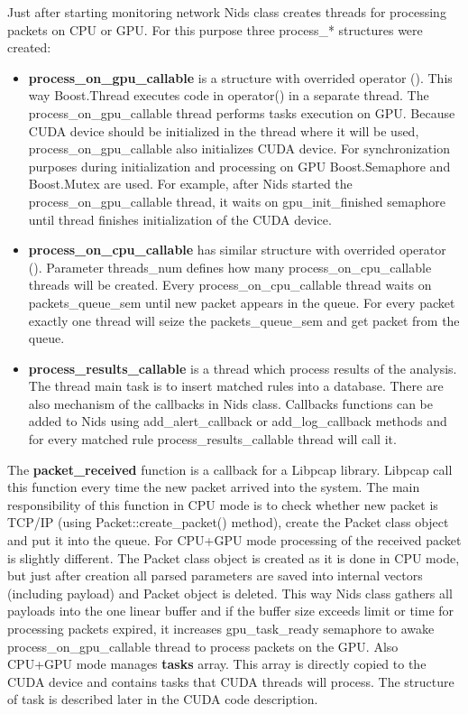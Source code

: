 \documentclass[thesis=M,english]{FITthesis}[2011/07/15]
\begin{document}
Just after starting monitoring network Nids class creates threads for processing packets on CPU or GPU. For this purpose three process\_* structures were created:
\begin{itemize}
\item \textbf{process\_on\_gpu\_callable} is a structure with overrided operator (). This way Boost.Thread executes code in operator() in a separate thread. The process\_on\_gpu\_callable thread performs tasks execution on GPU. Because CUDA device should be initialized in the thread where it will be used, process\_on\_gpu\_callable also initializes CUDA device. For synchronization purposes during initialization and processing on GPU Boost.Semaphore and Boost.Mutex are used. For example, after Nids started the process\_on\_gpu\_callable thread, it waits on gpu\_init\_finished semaphore until thread finishes initialization of the CUDA device.
\item \textbf{process\_on\_cpu\_callable} has similar structure with overrided operator (). Parameter threads\_num defines how many process\_on\_cpu\_callable threads will be created. Every process\_on\_cpu\_callable thread waits on packets\_queue\_sem until new packet appears in the queue. For every packet exactly one thread will seize the packets\_queue\_sem and get packet from the queue.
\item \textbf{process\_results\_callable} is a thread which process results of the analysis. The thread main task is to insert matched rules into a database. There are also mechanism of the callbacks in Nids class. Callbacks functions can be added to Nids using add\_alert\_callback or add\_log\_callback methods and for every matched rule process\_results\_callable thread will call it.
\end{itemize}

The \textbf{packet\_received} function is a callback for a Libpcap library. Libpcap call this function every time the new packet arrived into the system. The main responsibility of this function in CPU mode is to check whether new packet is TCP/IP (using Packet::create\_packet() method), create the Packet class object and put it into the queue. For CPU+GPU mode processing of the received packet is slightly different. The Packet class object is created as it is done in CPU mode, but just after creation all parsed parameters are saved into internal vectors (including payload) and Packet object is deleted. This way Nids class gathers all payloads into the one linear buffer and if the buffer size exceeds limit or time for processing packets expired, it increases gpu\_task\_ready semaphore to awake process\_on\_gpu\_callable thread to process packets on the GPU. Also CPU+GPU mode manages \textbf{tasks} array. This array is directly copied to the CUDA device and contains tasks that CUDA threads will process. The structure of task is described later in the CUDA code description.
\end{document}
